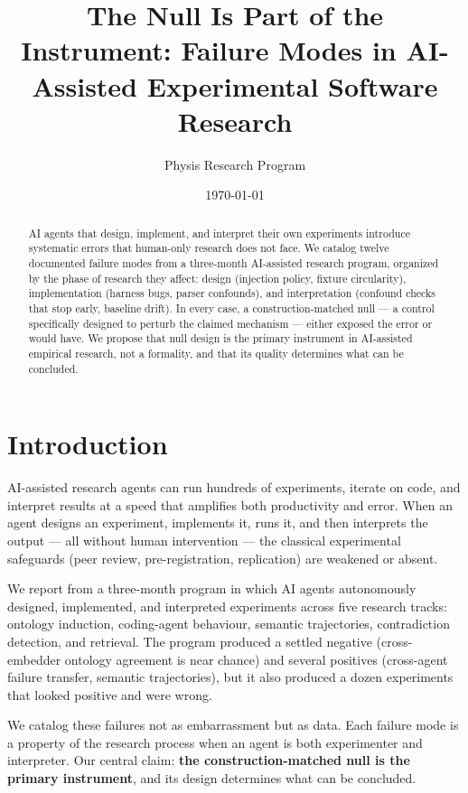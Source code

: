 \documentclass[11pt]{article}
\title{The Null Is Part of the Instrument: Failure Modes in AI-Assisted Experimental Software Research}
\author{Physis Research Program}
\date{\today}
\begin{document}
\maketitle

\begin{abstract}
AI agents that design, implement, and interpret their own experiments
introduce systematic errors that human-only research does not face. We
catalog twelve documented failure modes from a three-month AI-assisted
research program, organized by the phase of research they affect: design
(injection policy, fixture circularity), implementation (harness bugs,
parser confounds), and interpretation (confound checks that stop early,
baseline drift). In every case, a construction-matched null --- a control
specifically designed to perturb the claimed mechanism --- either exposed
the error or would have. We propose that null design is the primary
instrument in AI-assisted empirical research, not a formality, and that
its quality determines what can be concluded.
\end{abstract}

\section{Introduction}

AI-assisted research agents can run hundreds of experiments, iterate on
code, and interpret results at a speed that amplifies both productivity
and error. When an agent designs an experiment, implements it, runs it,
and then interprets the output --- all without human intervention --- the
classical experimental safeguards (peer review, pre-registration,
replication) are weakened or absent.

We report from a three-month program in which AI agents autonomously
designed, implemented, and interpreted experiments across five research
tracks: ontology induction, coding-agent behaviour, semantic trajectories,
contradiction detection, and retrieval. The program produced a settled
negative (cross-embedder ontology agreement is near chance) and several
positives (cross-agent failure transfer, semantic trajectories), but it
also produced a dozen experiments that looked positive and were wrong.

We catalog these failures not as embarrassment but as data. Each failure
mode is a property of the research process when an agent is both
experimenter and interpreter. Our central claim: \textbf{the
construction-matched null is the primary instrument}, and its design
determines what can be concluded.
\end{document}
